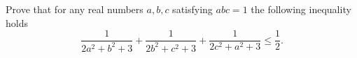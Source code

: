 Prove that for any real numbers $a,b,c$ satisfying $abc = 1$ the following inequality holds\[\dfrac{1} {2a^2+b^2+3}+\dfrac {1} {2b^2+c^2+3}+\dfrac{1} {2c^2+a^2+3}\leq \dfrac {1} {2}.\]